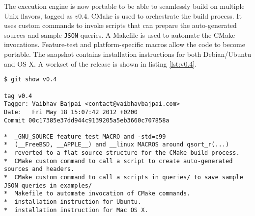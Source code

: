 The execution engine is now portable to be able to seamlessly build on
multiple Unix flavors, tagged as $v0.4$. CMake is used to orchestrate the
build process. It uses custom commands to invoke scripts that can prepare the
auto-generated  sources and sample \texttt{JSON}
queries. A Makefile is used to automate the CMake invocations. Feature-test
and platform-specific macros allow the code to become portable. The snapshot
contains installation instructions for both Debian/Ubuntu and OS X. A workset
of the release is shown in listing \ref{lst:v0.4}.

\begin{lstlisting}
$ git show v0.4

tag v0.4
Tagger: Vaibhav Bajpai <contact@vaibhavbajpai.com>
Date:   Fri May 18 15:07:42 2012 +0200
Commit 00c17385e37dd944c9139205a5eb3660c707858a

*  _GNU_SOURCE feature test MACRO and -std=c99
*  (__FreeBSD, __APPLE__) and __linux MACROS around qsort_r(...)
*  reverted to a flat source structure for the CMake build process.
*  CMake custom command to call a script to create auto-generated sources and headers.
*  CMake custom command to call a scripts in queries/ to save sample JSON queries in examples/
*  Makefile to automate invocation of CMake commands.
*  installation instruction for Ubuntu.
*  installation instruction for Mac OS X.
\end{lstlisting}

